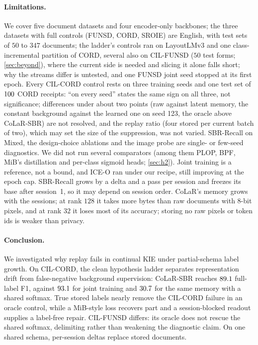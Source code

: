 \documentclass[10pt,twocolumn,letterpaper]{article}
\begin{document}
\paragraph{Limitations.} We cover five document datasets and four encoder-only backbones; the three datasets with full controls (FUNSD, CORD, SROIE) are English, with test sets of $50$ to $347$ documents; the ladder's controls ran on LayoutLMv3 and one class-incremental partition of CORD, several also on CIL-FUNSD ($50$ test forms; \cref{sec:beyond}), where the current side is needed and slicing it alone falls short; why the streams differ is untested, and one FUNSD joint seed stopped at its first epoch. Every CIL-CORD control rests on three training seeds and one test set of $100$ CORD receipts: ``on every seed'' states the same sign on all three, not significance; differences under about two points (raw against latent memory, the constant background against the learned one on seed 123, the oracle above CoLaR-SBR) are not resolved, and the replay ratio (four stored per current batch of two), which may set the size of the suppression, was not varied. SBR-Recall on Mixed, the design-choice ablations and the image probe are single- or few-seed diagnostics. We did not run several comparators (among them PLOP, BPF, MiB's distillation and per-class sigmoid heads; \cref{sec:h2}). Joint training is a reference, not a bound, and ICE-O ran under our recipe, still improving at the epoch cap. SBR-Recall grows by a delta and a pass per session and freezes its base after session~1, so it may depend on session order. CoLaR's memory grows with the sessions; at rank $128$ it takes more bytes than raw documents with 8-bit pixels, and at rank $32$ it loses most of its accuracy; storing no raw pixels or token ids is weaker than privacy.

\paragraph{Conclusion.} We investigated why replay fails in continual KIE under partial-schema label growth. On CIL-CORD, the clean hypothesis ladder separates representation drift from false-negative background supervision: CoLaR-SBR reaches $89.1$ full-label F1, against $93.1$ for joint training and $30.7$ for the same memory with a shared softmax. True stored labels nearly remove the CIL-CORD failure in an oracle control, while a MiB-style loss recovers part and a session-blocked readout supplies a label-free repair. CIL-FUNSD differs: its oracle does not rescue the shared softmax, delimiting rather than weakening the diagnostic claim. On one shared schema, per-session deltas replace stored documents.\label{mainend}%
\end{document}
